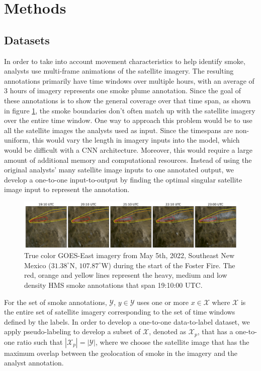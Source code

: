 \section{Methods}
\label{sec:formatting}
\subsection{Datasets}

In order to take into account movement characteristics to help identify smoke, analysts use multi-frame animations of the satellite imagery. The resulting annotations primarily have time windows over multiple hours, with an average of 3 hours of imagery represents one smoke plume annotation. Since the goal of these annotations is to show the general coverage over that time span, as shown in figure \ref{timelapse}, the smoke boundaries don't often match up with the satellite imagery over the entire time window. One way to approach this problem would be to use all the satellite images the analysts used as input. Since the timespans are non-uniform, this would vary the length in imagery inputs into the model, which would be difficult with a CNN architecture. Moreover, this would require a large amount of additional memory and computational resources. Instead of using the original analysts' many satellite image inputs to one annotated output, we develop a one-to-one input-to-output by finding the optimal singular satellite image input to represent the annotation. 

\begin{figure}
    \centering
    \includegraphics[width=\linewidth]{figures/TIMELAPSE_FINAL2.png}
    \caption{True color GOES-East imagery from May 5th, 2022, Southeast New Mexico (\(31.38^{\circ}\)N, \(107.87^{\circ}\)W) during the start of the Foster Fire. The red, orange and yellow lines represent the heavy, medium and low density HMS smoke annotations that span 19:10:00 UTC.}
    \label{timelapse}
\end{figure}



For the set of smoke annotations, \(\mathcal{Y}\), \(y \in \mathcal{Y}\) uses one or more \(x \in \mathcal{X}\) where \(\mathcal{X}\) is the entire set of satellite imagery corresponding to the set of time windows defined by the labels. In order to develop a one-to-one data-to-label dataset, we apply pseudo-labeling to develop a subset of \(\mathcal{X}\), denoted as \(\mathcal{X}_p\), that has a one-to-one ratio such that \(|\mathcal{X}_p| = |\mathcal{Y}|\), where we choose the satellite image that has the maximum overlap between the geolocation of smoke in the imagery and the analyst annotation.

